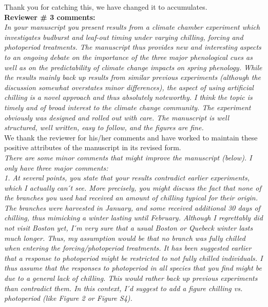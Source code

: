 \documentclass[11pt,a4paper]{article}
\begin{document}
Thank you for catching this, we have changed it to accumulates.  \\


{\bf Reviewer \# 3 comments:} \\


\emph{In your manuscript you present results from a climate chamber experiment which investigates
budburst and leaf-out timing under varying chilling, forcing and photoperiod treatments.
The manuscript thus provides new and interesting aspects to an ongoing debate on the
importance of the three major phenological cues as well as on the predictability of climate
change impacts on spring phenology. While the results mainly back up results from similar
previous experiments (although the discussion somewhat overstates minor differences), the
aspect of using artificial chilling is a novel approach and thus absolutely noteworthy.
I think the topic is timely and of broad interest to the climate change community. The
experiment obviously was designed and rolled out with care. The manuscript is well
structured, well written, easy to follow, and the figures are fine.}\\

We thank the reviewer for his/her comments and have worked to maintain these positive attributes of the manuscript in its revised form. \\

\emph{There are some minor comments that might improve the manuscript (below). I only have three
major comments:\\
1.      At several points, you state that your results contradict earlier experiments, which
I actually can ́t see. More precisely, you might discuss the fact that none of the branches
you used had received an amount of chilling typical for their origin. The branches were
harvested in January, and some received additional 30 days of chilling, thus mimicking a
winter lasting until February. Although I regrettably did not visit Boston yet, I ́m very sure
that a usual Boston or Quebeck winter lasts much longer. Thus, my assumption would be that no
branch was fully chilled when entering the forcing/photoperiod treatments. It has been
suggested earlier that a response to photoperiod might be restricted to not fully chilled
individuals. I thus assume that the responses to photoperiod in all species that you find
might be due to a general lack of chilling. This would rather back up previous experiments
than contradict them.
In this context, I ́d suggest to add a figure chilling vs. photoperiod (like Figure 2 or
Figure S4).}\\
\end{document}
